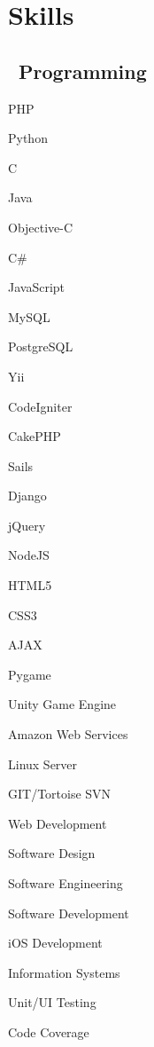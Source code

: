 \section*{Skills}

\subsection*{{\color{special-color}\faCode \  Programming}}
\speciallinebreak
\begin{description}
	\begin{multicols}{5}
    
	\item PHP
    \item Python
    \item C
    \item Java
    \item Objective-C
    \item C\#
    \item JavaScript
    \item MySQL
    \item PostgreSQL
    
    \item Yii
    \item CodeIgniter
    \item CakePHP
    \item Sails
    \item Django
    
    \item jQuery
    \item NodeJS
    \item HTML5
    \item CSS3
    \item AJAX
    \item Pygame
    
    \end{multicols}
\end{description}

\speciallinebreak
\begin{description}
    \begin{multicols}{4}
    
    \item Unity Game Engine
    \item Amazon Web Services
    \item Linux Server
    \item GIT/Tortoise SVN
    
    \item Web Development
    \item Software Design
    \item Software Engineering
    \item Software Development
    
    \item iOS Development
    \item Information Systems
    \item Unit/UI Testing
    \item Code Coverage
    
    \end{multicols}
\end{description}

